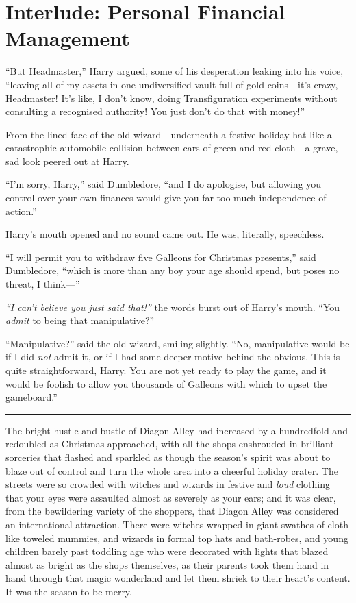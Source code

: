 \chapter{Interlude: Personal Financial Management}

``But Headmaster,'' Harry argued, some of his desperation leaking into
his voice, ``leaving all of my assets in one undiversified vault full of
gold coins---it's crazy, Headmaster! It's like, I don't know, doing
Transfiguration experiments without consulting a recognised authority!
You just don't do that with money!''

From the lined face of the old wizard---underneath a festive holiday hat
like a catastrophic automobile collision between cars of green and red
cloth---a grave, sad look peered out at Harry.

``I'm sorry, Harry,'' said Dumbledore, ``and I do apologise, but
allowing you control over your own finances would give you far too much
independence of action.''

Harry's mouth opened and no sound came out. He was, literally,
speechless.

``I will permit you to withdraw five Galleons for Christmas presents,''
said Dumbledore, ``which is more than any boy your age should spend, but
poses no threat, I think---''

\emph{``I can't believe you just said that!''} the words burst out of
Harry's mouth. ``You \emph{admit} to being that manipulative?''

``Manipulative?'' said the old wizard, smiling slightly. ``No,
manipulative would be if I did \emph{not} admit it, or if I had some
deeper motive behind the obvious. This is quite straightforward, Harry.
You are not yet ready to play the game, and it would be foolish to allow
you thousands of Galleons with which to upset the gameboard.''

\begin{center}\rule{3in}{0.4pt}\end{center}

The bright hustle and bustle of Diagon Alley had increased by a
hundredfold and redoubled as Christmas approached, with all the shops
enshrouded in brilliant sorceries that flashed and sparkled as though
the season's spirit was about to blaze out of control and turn the whole
area into a cheerful holiday crater. The streets were so crowded with
witches and wizards in festive and \emph{loud} clothing that your eyes
were assaulted almost as severely as your ears; and it was clear, from
the bewildering variety of the shoppers, that Diagon Alley was
considered an international attraction. There were witches wrapped in
giant swathes of cloth like toweled mummies, and wizards in formal top
hats and bath-robes, and young children barely past toddling age who
were decorated with lights that blazed almost as bright as the shops
themselves, as their parents took them hand in hand through that magic
wonderland and let them shriek to their heart's content. It was the
season to be merry.

